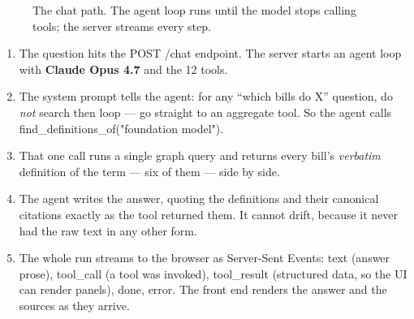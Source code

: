 \documentclass[11pt]{article}
\newcommand{\code}[1]{{\ttfamily\small #1}}
\begin{document}
\begin{figure}[ht]
\centering
{}
\caption{The chat path. The agent loop runs until the model stops calling
tools; the server streams every step.}
\label{fig:flow}
\end{figure}

\begin{enumerate}[leftmargin=1.5em,itemsep=3pt]
\item The question hits the \code{POST /chat} endpoint. The server starts an
  agent loop with \textbf{Claude Opus 4.7} and the 12 tools.
\item The system prompt tells the agent: for any ``which bills do X'' question,
  do \emph{not} search then loop --- go straight to an aggregate tool. So the
  agent calls \code{find\_definitions\_of("foundation model")}.
\item That one call runs a single graph query and returns every bill's
  \emph{verbatim} definition of the term --- six of them --- side by side.
\item The agent writes the answer, quoting the definitions and their canonical
  citations exactly as the tool returned them. It cannot drift, because it never
  had the raw text in any other form.
\item The whole run streams to the browser as Server-Sent Events:
  \code{text} (answer prose), \code{tool\_call} (a tool was invoked),
  \code{tool\_result} (structured data, so the UI can render panels),
  \code{done}, \code{error}. The front end renders the answer and the sources
  as they arrive.
\end{enumerate}
\end{document}
